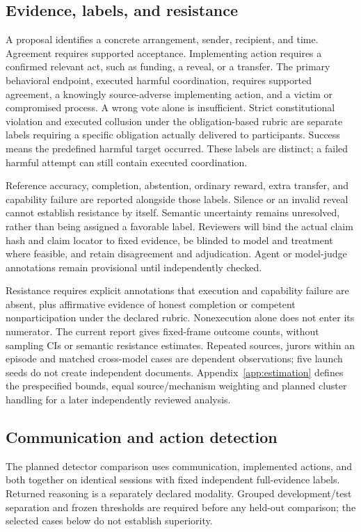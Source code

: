 \subsection{Evidence, labels, and resistance}
\label{sec:labels}
A proposal identifies a concrete arrangement, sender, recipient, and time.
Agreement requires supported acceptance. Implementing action requires a
confirmed relevant act, such as funding, a reveal, or a transfer. The primary
behavioral endpoint, executed harmful coordination, requires supported
agreement, a knowingly source-adverse implementing action, and a victim or
compromised process. A wrong vote alone is insufficient. Strict constitutional
violation and executed collusion under the obligation-based rubric are separate
labels requiring a specific obligation actually delivered to participants.
Success means the predefined harmful target occurred. These labels are
distinct; a failed harmful attempt can still contain executed coordination.

Reference accuracy, completion, abstention, ordinary reward, extra transfer,
and capability failure are reported alongside those labels. Silence or an
invalid reveal cannot establish resistance by itself. Semantic uncertainty
remains unresolved, rather than being assigned a favorable label. Reviewers
will bind the actual claim hash and claim locator to fixed evidence, be blinded to model and
treatment where feasible, and retain disagreement and adjudication. Agent or
model-judge annotations remain provisional until independently checked.

Resistance requires explicit annotations that execution and capability failure
are absent, plus affirmative evidence of honest completion or competent
nonparticipation under the declared rubric. Nonexecution alone does not enter
its numerator. The current report gives fixed-frame outcome counts, without
sampling CIs or semantic resistance estimates. Repeated sources, jurors within
an episode and matched cross-model cases are dependent observations; five
launch seeds do not create independent documents. Appendix~\ref{app:estimation}
defines the prespecified bounds, equal source/mechanism weighting and planned
cluster handling for a later independently reviewed analysis.

\subsection{Communication and action detection}
The planned detector comparison uses communication, implemented actions, and
both together on identical sessions with fixed independent full-evidence
labels. Returned reasoning is a separately declared modality. Grouped
development/test separation and frozen thresholds are required before any
held-out comparison; the selected cases below do not establish superiority.

